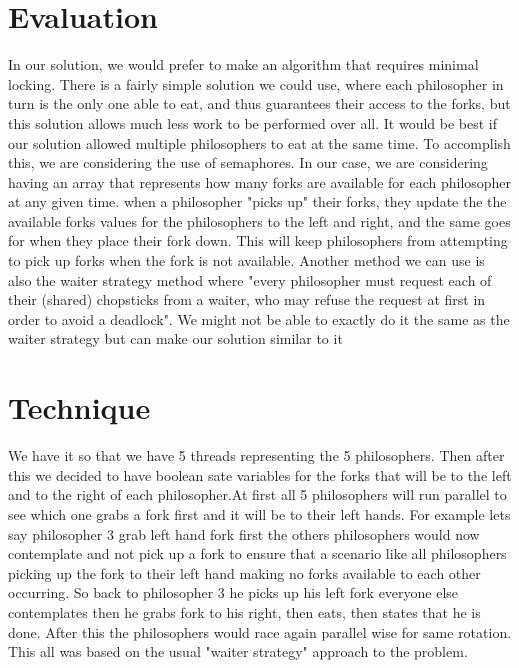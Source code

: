 \documentclass[conference]{IEEEtran}
\begin{document}
	\section{Evaluation}
	In our solution, we would prefer to make an algorithm that requires minimal locking. There is a fairly simple solution we could use, where each philosopher in turn is the only one able to eat, and thus guarantees their access to the forks, but this solution allows much less work to be performed over all. It would be best if our solution allowed multiple philosophers to eat at the same time. To accomplish this, we are considering the use of semaphores. In our case, we are considering having an array that represents how many forks are available for each philosopher at any given time. when a philosopher "picks up" their forks, they update the the available forks values for the philosophers to the left and right, and the same goes for when they place their fork down. This will keep philosophers from attempting to pick up forks when the fork is not available. 
	\linebreak
	Another method we can use is also the waiter strategy method where "every philosopher must request each of their (shared) chopsticks from a waiter, who may refuse the request at first in order to avoid a deadlock". We might not be able to exactly do it the same as the waiter strategy but can make our solution similar to it
	\section{Technique}
	We have it so that we have 5 threads representing the 5 philosophers. Then after this we decided to have boolean sate variables for the forks that will be to the left and to the right of each philosopher.At first all 5 philosophers will run parallel to see which one grabs a fork first and it will be to their left hands. For example lets say philosopher 3 grab left hand fork first the others philosophers would now contemplate and not pick up a fork to ensure that a scenario like all philosophers picking up the fork to their left hand making no forks available to each other occurring. So back to philosopher 3 he picks up his left fork everyone else contemplates then he grabs fork to his right, then eats, then states that he is done. After this the philosophers would race again parallel wise for same rotation. This all was based on the usual "waiter strategy" approach to the problem.
\end{document}
